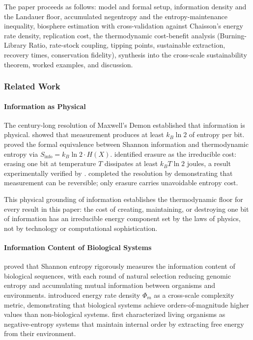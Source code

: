 \documentclass[11pt]{article}
\theoremstyle{plain}
\theoremstyle{definition}
\theoremstyle{remark}
\let\origsubsubsection\subsubsection
\renewcommand{\subsubsection}{\needspace{4\baselineskip}\origsubsubsection}
\let\origparagraphcmd\paragraph
\renewcommand{\paragraph}{\needspace{3\baselineskip}\origparagraphcmd}
\begin{document}
The paper proceeds as follows: model and formal setup, information
density and the Landauer floor, accumulated negentropy and the
entropy-maintenance inequality, biosphere estimation with
cross-validation against Chaisson's energy rate density, replication
cost, the thermodynamic cost-benefit analysis (Burning-Library Ratio,
rate-stock coupling, tipping points, sustainable extraction, recovery
times, conservation fidelity), synthesis into the cross-scale
sustainability theorem, worked examples, and discussion.

\subsubsection{Related Work}\label{related-work-3}

\paragraph{Information as Physical}\label{information-as-physical}

The century-long resolution of Maxwell's Demon established that
information is physical. \citet{Szilard1929} showed that measurement
produces at least \(k_B \ln 2\) of entropy per bit.
\citeauthor{Brillouin1951}
\citetext{\citeyear{Brillouin1951}; \citeyear{Brillouin1962}} proved the
formal equivalence between Shannon information and thermodynamic entropy
via \(S_{\text{info}} = k_B \ln 2 \cdot H(X)\). \citet{Landauer1961}
identified erasure as the irreducible cost: erasing one bit at
temperature \(T\) dissipates at least \(k_B T \ln 2\) joules, a result
experimentally verified by \citet{Berut2012}. \citeauthor{Bennett1973}
\citetext{\citeyear{Bennett1973}; \citeyear{Bennett1982}} completed the
resolution by demonstrating that measurement can be reversible; only
erasure carries unavoidable entropy cost.

This physical grounding of information establishes the thermodynamic
floor for every result in this paper: the cost of creating, maintaining,
or destroying one bit of information has an irreducible energy component
set by the laws of physics, not by technology or computational
sophistication.

\paragraph{Information Content of Biological
Systems}\label{information-content-of-biological-systems}

\citet{Adami2004} proved that Shannon entropy rigorously measures the
information content of biological sequences, with each round of natural
selection reducing genomic entropy and accumulating mutual information
between organisms and environments. \citet{Chaisson2011} introduced
energy rate density \(\Phi_m\) as a cross-scale complexity metric,
demonstrating that biological systems achieve orders-of-magnitude higher
values than non-biological systems. \citet{Schrodinger1944} first
characterized living organisms as negative-entropy systems that maintain
internal order by extracting free energy from their environment.
\end{document}
